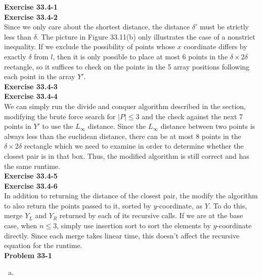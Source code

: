 \documentclass{article}
\begin{document}
\noindent\textbf{Exercise 33.4-1}\\



\noindent\textbf{Exercise 33.4-2}\\

Since we only care about the shortest distance, the distance $\delta'$ must be strictly less than $\delta$.  The picture in Figure 33.11(b) only illustrates the case of a nonstrict inequality.  If we exclude the possibility of points whose $x$ coordinate differs by exactly $\delta$ from $l$, then it is only possible to place at most 6 points in the $\delta \times 2\delta$ rectangle, so it suffices to check on the points in the 5 array positions following each point in the array $Y'$. \\

\noindent\textbf{Exercise 33.4-3}\\


\noindent\textbf{Exercise 33.4-4}\\

We can simply run the divide and conquer algorithm described in the section, modifying the brute force search for $|P| \leq 3$ and the check against the next 7 points in $Y'$ to use the $L_\infty$ distance.  Since the $L_\infty$ distance between two points is always less than the euclidean distance, there can be at most 8 points in the $\delta \times 2\delta$ rectangle which we need to examine in order to determine whether the closest pair is in that box.  Thus, the modified algorithm is still correct and has the same runtime. \\

\noindent\textbf{Exercise 33.4-5}\\



\noindent\textbf{Exercise 33.4-6}\\

In addition to returning the distance of the closest pair, the modify the algorithm to also return the points passed to it, sorted by $y$-coordinate, as $Y$.  To do this, merge $Y_L$ and $Y_R$ returned by each of its recursive calls.  If we are at the base case, when $n \leq 3$, simply use insertion sort to sort the elements by $y$-coordinate directly. Since each merge takes linear time, this doesn't affect the recursive equation for the runtime. \\

\noindent\textbf{Problem 33-1}\\
\begin{enumerate}[a.]
\item
\end{enumerate}
\end{document}
